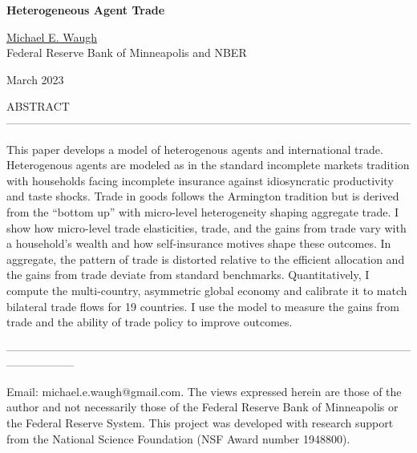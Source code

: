 \documentclass[12pt,pdftex]{article}
\begin{document}
\begin{onehalfspacing}

{\large \textbf{Heterogeneous Agent Trade}}

\vspace{0.5cm}

\href{http://www.waugheconomics.com/}{Michael E. Waugh} \\ Federal Reserve Bank of Minneapolis and NBER

\vspace{0.5cm}

March 2023

\vspace{1.5cm}


\normalsize

ABSTRACT ------------------------------------------------------------------------------------------------------------

This paper develops a model of heterogenous agents and international trade. Heterogenous agents are modeled as in the standard incomplete markets tradition with households facing incomplete insurance against idiosyncratic productivity and taste shocks. Trade in goods follows the Armington tradition but is derived from the ``bottom up'' with micro-level heterogeneity shaping aggregate trade. I show how micro-level trade elasticities, trade, and the gains from trade vary with a household's wealth and how self-insurance motives shape these outcomes. In aggregate, the pattern of trade is distorted relative to the efficient allocation and the gains from trade deviate from standard benchmarks. Quantitatively, I compute the multi-country, asymmetric global economy and calibrate it to match bilateral trade flows for 19 countries. I use the model to measure the gains from trade and the ability of trade policy to improve outcomes.

------------------------------------------------------------------------------------------------------------------------------
%

\vspace{6.25cm}

\footnotesize Email: michael.e.waugh@gmail.com. The views expressed herein are those of the author and not necessarily those of the Federal
Reserve Bank of Minneapolis or the Federal Reserve System. This project was developed with research support from the National Science Foundation (NSF Award number 1948800).


\end{onehalfspacing}
\end{document}
